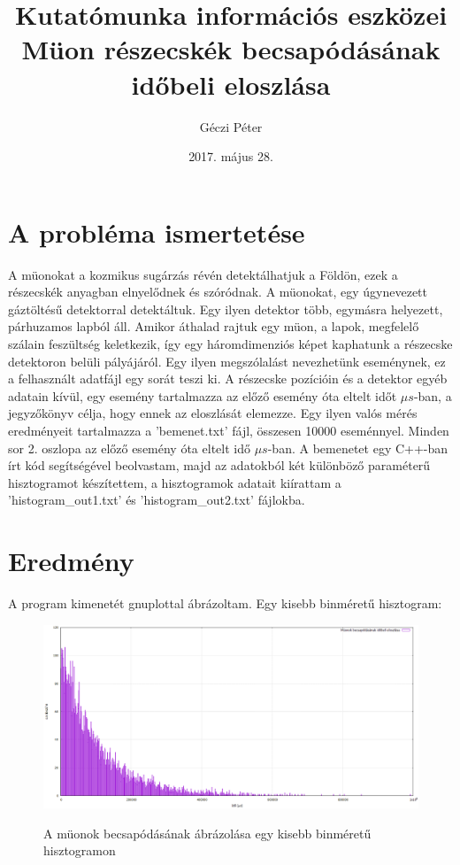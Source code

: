 \documentclass[a4paper,11pt]{article}
\author{Géczi Péter}
\title{
		Kutatómunka információs eszközei \\
		\textbf{Müon részecskék becsapódásának időbeli eloszlása}}
\date{2017. május 28.}
\begin{document}
\maketitle
\pagebreak

\section{A probléma ismertetése}
A müonokat a kozmikus sugárzás révén detektálhatjuk a Földön, ezek a részecskék anyagban elnyelődnek és szóródnak. A müonokat, egy úgynevezett gáztöltésű detektorral detektáltuk. Egy ilyen detektor több, egymásra helyezett, párhuzamos lapból áll. Amikor áthalad rajtuk egy müon, a lapok, megfelelő szálain feszültség keletkezik, így egy háromdimenziós képet kaphatunk a részecske detektoron belüli pályájáról. Egy ilyen megszólalást nevezhetünk eseménynek, ez a felhasznált adatfájl egy sorát teszi ki. A részecske pozícióin és a detektor egyéb adatain kívül, egy esemény tartalmazza az előző esemény óta eltelt időt $\mu s$-ban, a jegyzőkönyv célja, hogy ennek az eloszlását elemezze.
\newline
Egy ilyen valós mérés eredményeit tartalmazza a 'bemenet.txt' fájl, összesen 10000 eseménnyel. Minden sor 2. oszlopa az előző esemény óta eltelt idő $\mu s$-ban. A bemenetet egy C++-ban írt kód segítségével beolvastam, majd az adatokból két különböző paraméterű hisztogramot készítettem, a hisztogramok adatait kiírattam a 'histogram\_out1.txt' és 'histogram\_out2.txt' fájlokba.

\section{Eredmény}
A program kimenetét gnuplottal ábrázoltam.
\newline
Egy kisebb binméretű hisztogram:

\begin{figure}[h]
{\centering \includegraphics[width=\linewidth]{histogram1.png}}
\caption{A müonok becsapódásának ábrázolása egy kisebb binméretű hisztogramon}
\end{figure}
\end{document}
